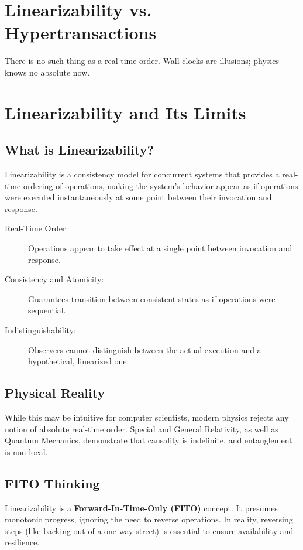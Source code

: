 \section{Linearizability vs. Hypertransactions}

There is no such thing as a real-time order. Wall clocks are illusions; physics knows no absolute now.

\section{Linearizability and Its Limits}

\subsection{What is Linearizability?}
Linearizability is a consistency model for concurrent systems that provides a real-time ordering of operations, making the system's behavior appear as if operations were executed instantaneously at some point between their invocation and response.

\begin{description}
  \item[Real-Time Order:] Operations appear to take effect at a single point between invocation and response.
  \item[Consistency and Atomicity:] Guarantees transition between consistent states as if operations were sequential.
  \item[Indistinguishability:] Observers cannot distinguish between the actual execution and a hypothetical, linearized one.
\end{description}

\subsection{Physical Reality}
While this may be intuitive for computer scientists, modern physics rejects any notion of absolute real-time order. Special and General Relativity, as well as Quantum Mechanics, demonstrate that causality is indefinite, and entanglement is non-local.

\subsection{FITO Thinking}
Linearizability is a \textbf{Forward-In-Time-Only (FITO)} concept. It presumes monotonic progress, ignoring the need to reverse operations. In reality, reversing steps (like backing out of a one-way street) is essential to ensure availability and resilience.

